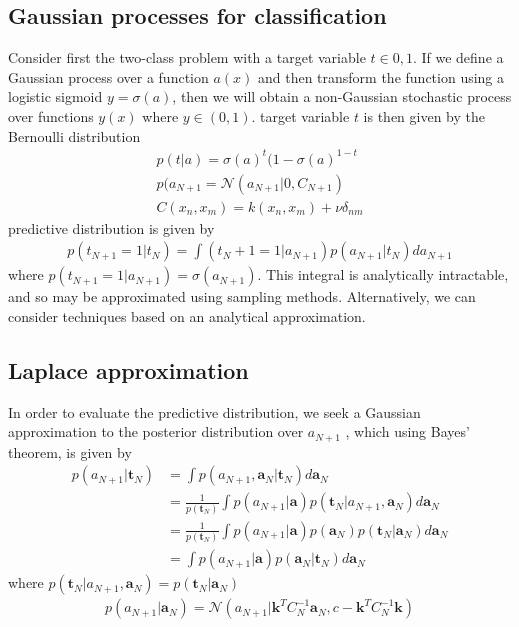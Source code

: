 \documentclass[a4paper]{article}
\begin{document}
\subsection{Gaussian processes for classiﬁcation}
Consider ﬁrst the two-class problem with a target variable $t \in {0,
  1}$. If we deﬁne a Gaussian process over a function $a(x)$ and then
transform the function using a logistic sigmoid $y = \sigma(a)$, then
we will obtain a non-Gaussian stochastic process over functions $y(x)$ where $y \in (0, 1)$.
target variable $t$ is then given by the Bernoulli distribution
\begin{align}
p(t|a) = \sigma(a)^t(1-\sigma(a)^{1-t}\\
p(a_{N+1} = \mathcal{N}(a_{N+1}|0, C_{N+1})\\
C(x_n, x_m) = k(x_n, x_m) + \nu \delta_{nm}
\end{align}
predictive distribution is given by
\begin{align}
p(t_{N+1} = 1|t_N) = \int (t_N+1 = 1|a_{N+1})p(a_{N+1}|t_N )da_{N +1}
\end{align}
where $p(t_{N+1} = 1|a_{N +1}) = \sigma(a_{N +1})$.
This integral is analytically intractable, and so may be approximated
using sampling methods. Alternatively, we can consider techniques
based on an analytical approximation.

\subsection{Laplace approximation}
In order to evaluate the predictive distribution, we seek a Gaussian
approximation to the posterior distribution over $a_{N+1}$ , which using Bayes' theorem, is given by
\begin{align*}
p(a_{N+1}|\mathbf{t}_N) &= \int p(a_{N+1},\mathbf{a}_N|\mathbf{t}_N)d\mathbf{a}_N\\
&= \frac{1}{p(\mathbf{t}_N)} \int
  p(a_{N+1}|\mathbf{a}) p(\mathbf{t}_N|a_{N+1},\mathbf{a}_N) d \mathbf{a}_N\\
&= \frac{1}{p(\mathbf{t}_N)} \int
  p(a_{N+1}|\mathbf{a})p(\mathbf{a}_N)  p(\mathbf{t}_N|\mathbf{a}_N)d\mathbf{a}_N\\
&= \int p(a_{N+1}|\mathbf{a})  p(\mathbf{a}_N|\mathbf{t}_N)d\mathbf{a}_N
\end{align*}
where $p(\mathbf{t}_N|a_{N+1},\mathbf{a}_N) = p(\mathbf{t}_N|\mathbf{a}_N) $
\begin{align}
p(a_{N+1}|\mathbf{a}_N) = \mathcal{N} (a_{N+1}|\mathbf{k}^T
  C_{N}^{-1}\mathbf{a}_N, c-\mathbf{k}^T C_{N}^{-1}\mathbf{k})
\end{align}
\end{document}
